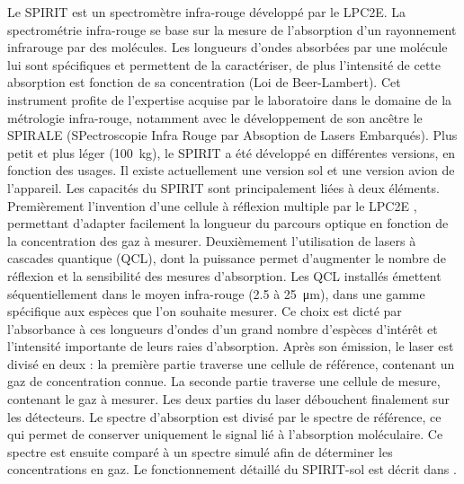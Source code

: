 Le SPIRIT est un spectromètre infra-rouge développé par le LPC2E.
La spectrométrie infra-rouge se base sur la mesure de l'absorption d'un rayonnement infrarouge par des molécules.
Les longueurs d'ondes absorbées par une molécule lui sont spécifiques et permettent de la caractériser, de plus l'intensité de cette absorption est fonction de sa concentration  (Loi de Beer-Lambert).
Cet instrument profite de l'expertise acquise par le laboratoire dans le domaine de la métrologie infra-rouge, notamment avec le développement de son ancêtre le SPIRALE (SPectroscopie Infra Rouge par Absoption de Lasers Embarqués).
Plus petit et plus léger (\SI{100}{\kilo\gram}), le SPIRIT a été développé en différentes versions, en fonction des usages.
Il existe actuellement une version sol et une version avion de l'appareil.
Les capacités du SPIRIT sont principalement liées à deux éléments.
Premièrement l'invention d'une cellule à réflexion multiple par le LPC2E \citep{robert2007}, permettant d'adapter facilement la longueur du parcours optique en fonction de la concentration des gaz à mesurer.
Deuxièmement l'utilisation de lasers à cascades quantique (QCL), dont la puissance permet d'augmenter le nombre de réflexion et la sensibilité des mesures d'absorption.
Les QCL installés émettent séquentiellement dans le moyen infra-rouge (\num{2.5} à \SI{25}{\micro\metre}), dans une gamme spécifique aux espèces que l'on souhaite mesurer.
Ce choix est dicté par l'absorbance à ces longueurs d'ondes d'un grand nombre d'espèces d'intérêt et l'intensité importante de leurs raies d'absorption.
Après son émission, le laser est divisé en deux : 
la première partie traverse une cellule de référence, contenant un gaz de concentration connue.
La seconde partie traverse une cellule de mesure, contenant le gaz à mesurer.
Les deux parties du laser débouchent finalement sur les détecteurs.
Le spectre d'absorption est divisé par le spectre de référence, ce qui permet de conserver uniquement le signal lié à l'absorption moléculaire. Ce spectre est ensuite comparé à un spectre simulé afin de déterminer les concentrations en gaz.
Le fonctionnement détaillé du SPIRIT-sol est décrit dans \cite{guimbaud2011}.


